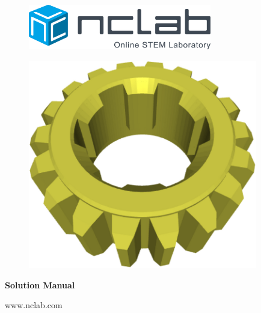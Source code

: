 \documentclass{article}
\begin{document}
\large

\vbox{}
\begin{figure}[!ht]
\includegraphics[width=8cm]{img/logo.png}
\vspace{18mm}
\end{figure}

\begin{figure}[!ht]
\begin{center}
\includegraphics[width=10cm]{img/plasm-frontpage.png}
\vspace{21mm}
\end{center}
\end{figure}

\centerline{\Huge \bf Solution Manual}

\vfill

\centerline{\Large www.nclab.com}

\newpage




\section*{}
\small

\end{document}
